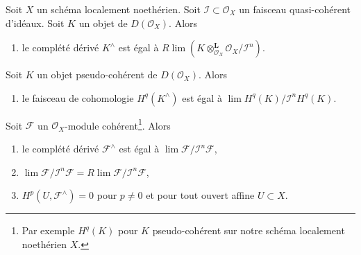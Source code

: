 \begin{lemma}
\label{lemma-derived-completion-pseudo-coherent}
Soit $X$ un schéma localement noethérien. Soit $\mathcal{I} \subset \mathcal{O}_X$
un faisceau quasi-cohérent d'idéaux.
Soit $K$ un objet de $D(\mathcal{O}_X)$. Alors
\begin{enumerate}
\item le complété dérivé $K^\wedge$ est égal à
$R\lim (K \otimes_{\mathcal{O}_X}^\mathbf{L} \mathcal{O}_X/\mathcal{I}^n)$.
\end{enumerate}
Soit $K$ un objet pseudo-cohérent de $D(\mathcal{O}_X)$. Alors
\begin{enumerate}
\item[(2)] le faisceau de cohomologie $H^q(K^\wedge)$ est égal à
$\lim H^q(K)/\mathcal{I}^nH^q(K)$.
\end{enumerate}
Soit $\mathcal{F}$ un $\mathcal{O}_X$-module cohérent\footnote{Par exemple
$H^q(K)$ pour $K$ pseudo-cohérent sur notre schéma localement noethérien $X$.}. Alors
\begin{enumerate}
\item[(3)] le complété dérivé $\mathcal{F}^\wedge$ est égal à
$\lim \mathcal{F}/\mathcal{I}^n\mathcal{F}$,
\item[(4)]
$\lim \mathcal{F}/\mathcal{I}^n \mathcal{F} =
R\lim \mathcal{F}/\mathcal{I}^n \mathcal{F}$,
\item[(5)] $H^p(U, \mathcal{F}^\wedge) = 0$ pour $p \not = 0$ et pour tout
ouvert affine $U \subset X$.
\end{enumerate}
\end{lemma}

